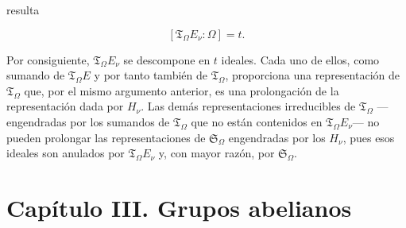 resulta

\[
[\mathfrak T_\Omega E_\nu:\Omega]=t.
\]

Por consiguiente, $\mathfrak T_\Omega E_\nu$ se descompone en $t$ ideales. Cada uno de ellos, como sumando de $\mathfrak T_\Omega E$ y por tanto también de $\mathfrak T_\Omega$, proporciona una representación de $\mathfrak T_\Omega$ que, por el mismo argumento anterior, es una prolongación de la representación dada por $H_\nu$. Las demás representaciones irreducibles de $\mathfrak T_\Omega$ ---engendradas por los sumandos de $\mathfrak T_\Omega$ que no están contenidos en $\mathfrak T_\Omega E_\nu$--- no pueden prolongar las representaciones de $\mathfrak S_\Omega$ engendradas por los $H_\nu$, pues esos ideales son anulados por $\mathfrak T_\Omega E_\nu$ y, con mayor razón, por $\mathfrak S_\Omega$.

\section*{Capítulo III. Grupos abelianos}
